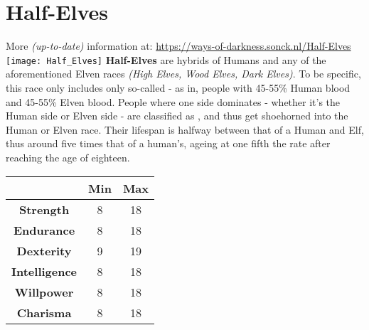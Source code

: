 \documentclass[openany,10pt,a4paper]{book}
\begin{document}
\section{Half-Elves}
More \textit{(up-to-date)} information at: \url{https://ways-of-darkness.sonck.nl/Half-Elves}\newline
\texttt{[image: Half\_Elves]}\newline
\textbf{Half-Elves} are hybrids of Humans and any of the aforementioned Elven races \textit{(High Elves, Wood Elves, Dark Elves)}. To be specific, this race only includes only so-called  - as in, people with 45-55\% Human blood and 45-55\% Elven blood. People where one side dominates - whether it's the Human side or Elven side - are classified as , and thus get shoehorned into the Human or Elven race. Their lifespan is halfway between that of a Human and Elf, thus around five times that of a human's, ageing at one fifth the rate after reaching the age of eighteen.\newline
\begin{tabular}{|c|c|c|}
\hline
 & \textbf{Min} & \textbf{Max} \\ \hline
\textbf{Strength} & 8 & 18 \\ \hline
\textbf{Endurance} & 8 & 18 \\ \hline
\textbf{Dexterity} & 9 & 19 \\ \hline
\textbf{Intelligence} & 8 & 18 \\ \hline
\textbf{Willpower} & 8 & 18 \\ \hline
\textbf{Charisma} & 8 & 18 \\ \hline
\end{tabular}\newline
{} \newpage
\end{document}
